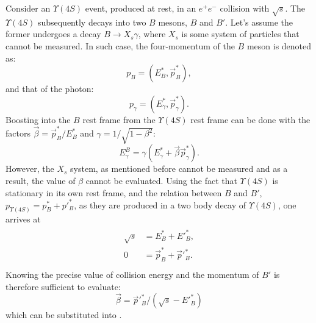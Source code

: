 \documentclass{article}
\begin{document}
Consider an $\Upsilon(4S)$ event, produced at rest, in an $e^+e^-$ collision with $\sqrt{s}$.
The $\Upsilon(4S)$ subsequently decays into two $B$ mesons, $B$ and $B'$.
Let's assume the former undergoes a decay $B\to X_s \gamma$, where $X_s$ is some system of particles that cannot be measured.
In such case, the four-momentum of the $B$ meson is denoted as:
\begin{equation}
	p_{B} = (E_B^*,\vec{p}_{B}^*),
\end{equation}
and that of the photon:
\begin{equation}
	p_{\gamma} = (E_{\gamma}^*,\vec{p}_{\gamma}^*).
\end{equation}
Boosting into the $B$ rest frame from the $\Upsilon(4S)$ rest frame can be done
with the factors $\vec{\beta}=\vec{p}_{B}^*/E_{B}^*$ and $\gamma = 1/\sqrt{1-\beta^2}$:
\begin{equation}\label{eq:egamma}
	E_{\gamma}^B = \gamma(E_{\gamma}^* + \vec{\beta}\vec{p}_{\gamma}^*). 
\end{equation}
However, the $X_s$ system, as mentioned before cannot be measured and as a result, the value of $\beta$ cannot be evaluated.
Using the fact that $\Upsilon(4S)$ is stationary in its own rest frame, and the relation between $B$ and $B'$,
$p_{\Upsilon(4S)}=p_B^*+p'^*_B$, as they are produced in a two body decay of $\Upsilon(4S)$,
one arrives at
\begin{align}
	\begin{split}
		\sqrt{s} &= E^*_{B}+E'^*_{B},\\
		0 &= \vec{p}_B^* + \vec{p}'^*_{B}.\\
	\end{split}
\end{align}
Knowing the precise value of collision energy and the momentum of $B'$ is therefore sufficient to evaluate:
\begin{equation}
	\vec{\beta}= \vec{p}'^*_B/(\sqrt{s}-E'^*_{B})
\end{equation}
which can be substituted into .
\end{document}
